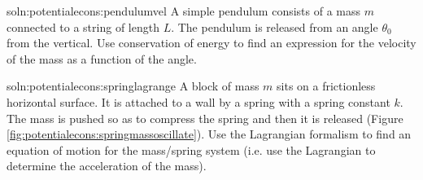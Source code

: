 \begin{problem}{soln:potentialecons:pendulumvel}{\label{prob:potentialecons:pendulumvel}
A simple pendulum consists of a mass $m$ connected to a string of length $L$. The pendulum is released from an angle $\theta_0$ from the vertical. Use conservation of energy to find an expression for the velocity of the mass as a function of the angle.}
\end{problem}


\begin{problem}{soln:potentialecons:springlagrange}{ \label{prob:potentialecons:springlagrange} A block of mass $m$ sits on a frictionless horizontal surface. It is attached to a wall by a spring with a spring constant $k$. The mass is pushed so as to compress the spring and then it is released (Figure \ref{fig:potentialecons:springmassoscillate}). Use the Lagrangian formalism to find an equation of motion for the mass/spring system (i.e. use the Lagrangian to determine the acceleration of the mass).}
\end{problem} 


\newpage
